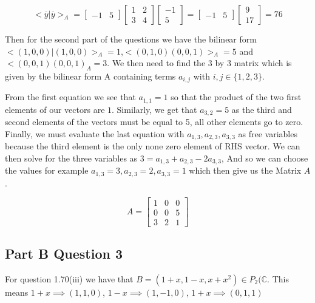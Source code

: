 \documentclass{article}
\begin{document}
\begin{equation*}
    <\overline{y}|\overline{y}>_A = \begin{bmatrix}
        -1 & 5
    \end{bmatrix}
    \begin{bmatrix}
        1&2\\3&4
    \end{bmatrix}
    \begin{bmatrix}
        -1\\5
    \end{bmatrix}
    =
    \begin{bmatrix}
        -1 & 5
    \end{bmatrix}
    \begin{bmatrix}
        9\\17
    \end{bmatrix}
    = 76
\end{equation*}

Then for the second part of the questions we have the bilinear form $<(1,0,0)|(1,0,0)>_A = 1$,$<(0,1,0)(0,0,1)>_A = 5$ and $<(0,0,1)(0,0,1)_A = 3$. We then need to find the $3$ by $3$ matrix which is given by the bilinear form A containing terms $a_{i,j}$ with $i,j \in \{ 1,2,3\}$.

From the first equation we see that $a_{1,1} = 1$ so that the product of the two first elements of our vectors are $1$. Similarly, we get that $a_{3,2} = 5$ as the third and second elements of the vectors must be equal to 5, all other elements go to zero. Finally, we must evaluate the last equation with $a_{1,3}, a_{2,3}, a_{3,3}$ as free variables because the third element is the only none zero element of RHS vector. We can then solve for the three variables as $3 = a_{1,3} + a_{2,3} - 2 a_{3,3}$, And so we can choose the values for example $a_{1,3} = 3, a_{2,3} = 2, a_{3,3} = 1$ which then give us the Matrix $A$.

\begin{equation*}
    A = \begin{bmatrix}
        1&0&0 \\ 0 & 0 & 5 \\ 3 & 2 & 1
    \end{bmatrix}
\end{equation*}

\subsection{Part B Question 3}
 For question 1.70(iii) we have that $B = (1+x,1-x,x + x^2) \in P_2(\mathbb{C}$. This means $1+x \implies (1,1,0)$, $1-x \implies (1,-1,0)$, $1+x \implies (0,1,1)$
\end{document}

